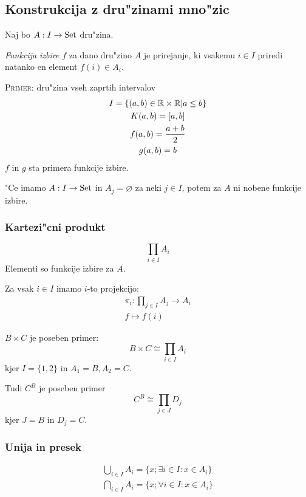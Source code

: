\subsection{Konstrukcija z dru"zinami mno"zic}
Naj bo $A: I \rightarrow \text{Set}$ dru"zina.

\emph{Funkcija izbire} $f$ za dano dru"zino $A$ je prirejanje, ki vsakemu $i \in I$ priredi natanko en element $f(i) \in A_i$.

\textsc{Primer:} dru"zina vseh zaprtih intervalov
\begin{gather*}
I = \{(a, b) \in \mathbb{R} \times \mathbb{R} | a \leq b\} \\
K(a,b) = [a, b] \\
f(a, b) = \dfrac{a + b}{2}\\
g(a, b) = b
\end{gather*}
$f$ in $g$ sta primera funkcije izbire.

"Ce imamo $A: I \rightarrow \text{Set}$ in $A_j = \varnothing$ za neki $j \in I$, potem za $A$ ni nobene funkcije izbire.
\subsubsection{Kartezi"cni produkt}
\begin{equation*}
\prod_{i \in I} A_i
\end{equation*}
Elementi so funkcije izbire za $A$.

Za vsak $i \in I$ imamo $i$-to projekcijo:
\begin{gather*}
\pi_i : \prod_{j \in I} A_j \rightarrow A_i \\
f \mapsto f(i)
\end{gather*}

$B \times C$ je poseben primer:
\begin{equation*}
B \times C \cong \prod_{i \in I}A_i
\end{equation*}
kjer $I = \{1, 2\}$ in $A_1 = B, A_2 = C$.

Tudi $C^B$ je poseben primer
\begin{equation*}
C^B \cong \prod_{j \in J} D_j
\end{equation*}
kjer $J = B$ in $D_j = C$.

\subsubsection{Unija in presek}
\begin{gather*}
\bigcup_{i \in I} A_i = \{x; \exists i \in I : x \in A_i\}\\
\bigcap_{i \in I} A_i = \{x; \forall i \in I : x \in A_i\}
\end{gather*}

